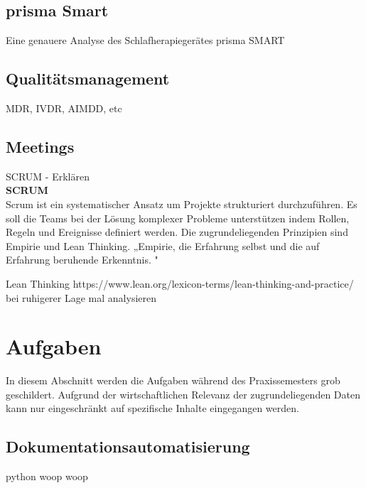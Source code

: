 \documentclass[a4paper, 12pt]{article}
\begin{document}

\newpage

\subsection{prisma Smart}\label{prismaSmart}
Eine genauere Analyse des Schlafherapiegerätes prisma SMART


\subsection{Qualitätsmanagement}\label{Qualitätsmanagement}
MDR, IVDR, AIMDD, etc

\subsection{Meetings}\label{Meetings}
SCRUM - Erklären
\\ 
\textbf{SCRUM}\\
Scrum ist ein systematischer Ansatz um Projekte strukturiert durchzuführen. Es soll die Teams bei der Lösung komplexer Probleme unterstützen indem Rollen, Regeln und Ereignisse definiert werden. Die zugrundeliegenden Prinzipien sind Empirie und Lean Thinking. 
„Empirie, die Erfahrung selbst und die auf Erfahrung beruhende Erkenntnis.  
 \cite{dorsch_empirie}"
 
Lean Thinking https://www.lean.org/lexicon-terms/lean-thinking-and-practice/
bei ruhigerer Lage mal analysieren %
 

\cite{scrum2020}


\newpage
\section{Aufgaben}\label{Aufgaben}
In diesem Abschnitt werden die Aufgaben während des Praxissemesters grob geschildert. Aufgrund der wirtschaftlichen Relevanz der zugrundeliegenden Daten kann nur eingeschränkt auf spezifische Inhalte eingegangen werden.

\subsection{Dokumentationsautomatisierung}\label{Dokumentationsautomatisierung}
python woop woop
\end{document}
